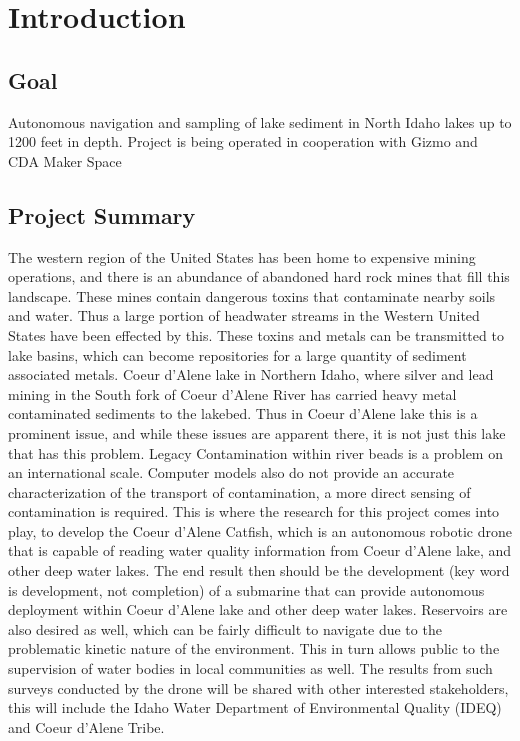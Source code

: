 \documentclass[12pt]{article}
\begin{document}
	\tableofcontents
	\newpage
	
	\section{Introduction}
	
		\subsection{Goal}
		Autonomous navigation and sampling of lake sediment in North Idaho lakes up to 1200 feet in depth. Project is being operated in cooperation with Gizmo and CDA Maker Space
	
		\subsection{Project Summary}
		The western region of the United States has been home to expensive mining operations, and there is an abundance of abandoned hard rock mines that fill this landscape. These mines contain dangerous toxins that contaminate nearby soils and water. Thus a large portion of headwater streams in the Western United States have been effected by this. These toxins and metals can be transmitted to lake basins, which can become repositories for a large quantity of sediment associated metals. Coeur d'Alene lake in Northern Idaho, where silver and lead mining in the South fork of Coeur d'Alene River has carried heavy metal contaminated sediments to the lakebed. Thus in Coeur d'Alene lake this is a prominent issue, and while these issues are apparent there, it is not just this lake that has this problem. Legacy Contamination within river beads is a problem on an international scale. Computer models also do not provide an accurate characterization of the transport of contamination, a more direct sensing of contamination is required. This is where the research for this project comes into play, to develop the Coeur d'Alene Catfish, which is an autonomous robotic drone that is capable of reading water quality information from Coeur d'Alene lake, and other deep water lakes. The end result then should be the development (key word is development, not completion) of a submarine that can provide autonomous deployment within Coeur d'Alene lake and other deep water lakes. Reservoirs are also desired as well, which can be fairly difficult to navigate due to the problematic kinetic nature of the environment. This in turn allows public to the supervision of water bodies in local communities as well. The results from such surveys conducted by the drone will be shared with other interested stakeholders, this will include the Idaho Water Department of Environmental Quality (IDEQ) and Coeur d'Alene Tribe.\\
\end{document}
